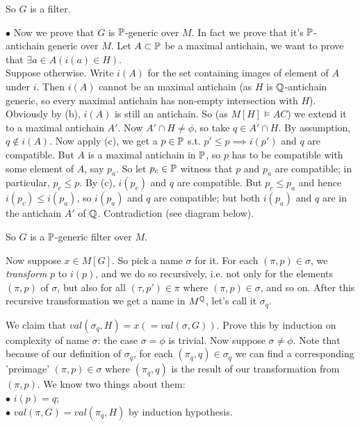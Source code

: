 \documentclass[a4paper]{article}
\begin{document}
So $G$ is a filter.

$\bullet$ Now we prove that $G$ is $\P$-generic over $M$. In fact we prove that it's $\P$-antichain generic over $M$. Let $A \subset \P$ be a maximal antichain, we want to prove that $\exists a \in A (i(a) \in H)$.\\
Suppose otherwise. Write $i(A)$ for the set containing images of element of $A$ under $i$. Then $i(A)$ cannot be an maximal antichain (as $H$ is $\Q$-antichain generic, so every maximal antichain has non-empty intersection with $H$). Obviously by (b), $i(A)$ is still an antichain. So (as $M[H] \vDash AC$) we extend it to a maximal antichain $A'$. Now $A' \cap H \neq \phi$, so take $q \in A' \cap H$. By assumption, $q \not\in i(A)$. Now apply (c), we get a $p \in \P$ s.t. $p' \leq p \implies i(p')$ and $q$ are compatible. But $A$ is a maximal antichain in $\P$, so $p$ has to be compatible with some element of $A$, say $p_a$. So let $p_c \in \P$ witness that $p$ and $p_a$ are compatible; in particular, $p_c \leq p$. By (c), $i(p_c)$ and $q$ are compatible. But $p_c \leq p_a$ and hence $i(p_c) \leq i(p_a)$, so $i(p_a)$ and $q$ are compatible; but both $i(p_a)$ and $q$ are in the antichain $A'$ of $\Q$. Contradiction (see diagram below).


So $G$ is a $\P$-generic filter over $M$.

Now suppose $x \in M[G]$. So pick a name $\sigma$ for it. For each $(\pi,p) \in \sigma$, we \emph{transform} $p$ to $i(p)$, and we do so recursively, i.e. not only for the elements $(\pi,p)$ of $\sigma$, but also for all $(\tau,p') \in \pi$ where $(\pi,p) \in \sigma$, and so on. After this recursive transformation we get a name in $M^\Q$, let's call it $\sigma_q$.

We claim that $val(\sigma_q,H)=x(=val(\sigma,G))$. Prove this by induction on complexity of name $\sigma$: the case $\sigma=\phi$ is trivial. Now suppose $\sigma \neq \phi$. Note that because of our definition of $\sigma_q$, for each $(\pi_q,q) \in \sigma_q$ we can find a corresponding 'preimage' $(\pi,p) \in \sigma$ where $(\pi_q,q)$ is the result of our transformation from $(\pi,p)$. We know two things about them:\\
$\bullet$ $i(p) = q$;\\
$\bullet$ $val(\pi,G) = val(\pi_q,H)$ by induction hypothesis.
\end{document}
